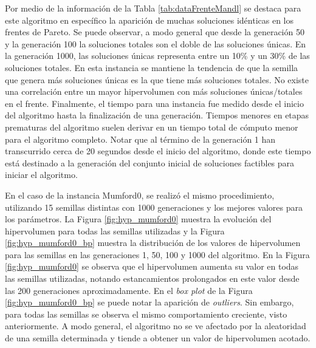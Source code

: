 Por medio de la información de la Tabla \ref{tab:dataFrenteMandl} se destaca para este algoritmo en específico la aparición de muchas soluciones idénticas en los frentes de Pareto. Se puede observar, a modo general que desde la generación 50 y la generación 100 la soluciones totales son el doble de las soluciones únicas. En la generación 1000, las soluciones únicas representa entre un 10\% y un 30\% de las soluciones totales. En esta instancia se mantiene la tendencia de que la semilla que genera más soluciones únicas es la que tiene más soluciones totales. No existe una correlación entre un mayor hipervolumen con más soluciones únicas/totales en el frente. Finalmente, el tiempo para una instancia fue medido desde el inicio del algoritmo hasta la finalización de una generación. Tiempos menores en etapas prematuras del algoritmo suelen derivar en un tiempo total de cómputo menor para el algoritmo completo. Notar que al término de la generación 1 han transcurrido cerca de 20 segundos desde el inicio del algoritmo, donde este tiempo está destinado a la generación del conjunto inicial de soluciones factibles para iniciar el algoritmo.

En el caso de la instancia Mumford0, se realizó el mismo procedimiento, utilizando 15 semillas distintas con 1000 generaciones y los mejores valores  para los parámetros. La Figura \ref{fig:hyp_mumford0} muestra la evolución del hipervolumen para todas las semillas utilizadas y la Figura \ref{fig:hyp_mumford0_bp} muestra la distribución de los valores de hipervolumen para las semillas en las generaciones 1, 50, 100 y 1000 del algoritmo. En la Figura \ref{fig:hyp_mumford0} se observa que el hipervolumen aumenta su valor en todas las semillas utilizadas, notando estancamientos prolongados en este valor desde las 200 generaciones aproximadamente. En el \textit{box plot} de la Figura \ref{fig:hyp_mumford0_bp} se puede notar la aparición de \textit{outliers}. Sin embargo, para todas las semillas se observa el mismo comportamiento creciente, visto anteriormente. A modo general, el algoritmo no se ve afectado por la aleatoridad de una semilla determinada y tiende a obtener un valor de hipervolumen acotado.

